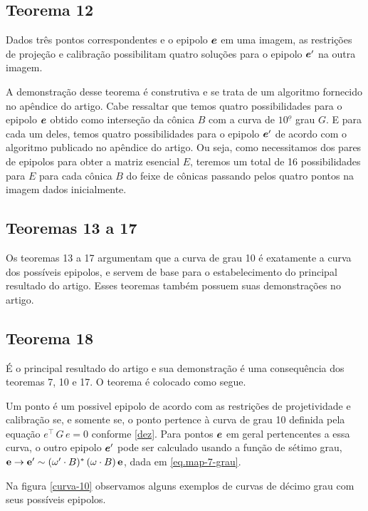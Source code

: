 \subsection{Teorema 12}
\begin{teorema}
Dados três pontos correspondentes e o epipolo $\boldsymbol{e}$
em uma imagem, as restrições de projeção e calibração possibilitam quatro soluções para o epipolo $\boldsymbol{e}'$ na outra imagem.
\end{teorema}
A demonstração desse teorema é construtiva e se trata de um algoritmo fornecido no apêndice do artigo. Cabe ressaltar que temos quatro possibilidades para o epipolo $\boldsymbol{e}$ obtido como interseção da cônica $B$ com a curva de $10^{\underline{o}}$ grau $G$. E para cada um deles, temos quatro possibilidades para o epipolo $\boldsymbol{e}'$ de acordo com o algoritmo publicado no apêndice do artigo. Ou seja, como necessitamos dos pares de epipolos para obter a matriz esencial $E$, teremos um total de 16 possibilidades para $E$ para cada cônica $B$ do feixe de cônicas passando pelos quatro pontos na imagem dados inicialmente. 


\subsection{Teoremas 13 a 17}
Os teoremas 13 a 17 argumentam que a curva de grau 10 é exatamente a curva dos possíveis epipolos, e servem de base para o estabelecimento do principal resultado do artigo. Esses teoremas também possuem suas demonstrações no artigo.  

\subsection{Teorema 18}
É o principal resultado do artigo e sua demonstração é uma consequência dos teoremas 7, 10 e 17. O teorema é colocado como segue.

\begin{teorema}
Um ponto é um possivel epipolo de acordo com as restrições de projetividade e calibração se, e somente se, o ponto pertence à curva de grau 10 definida pela equação $e^\top\,G\,e=0$ conforme \ref{dez}. Para pontos $\boldsymbol{e}$ em geral pertencentes a essa curva, o outro epipolo $\boldsymbol{e}'$ pode ser calculado usando a função de sétimo grau, ${\bf e} \rightarrow {\bf e'} \sim (\omega' \cdot B)^*\,(\omega \cdot B)\,{\bf e}
$, dada em \ref{eq.map-7-grau}.
\end{teorema}

Na figura \ref{curva-10} observamos alguns exemplos de curvas de décimo grau com seus possíveis epipolos. 

